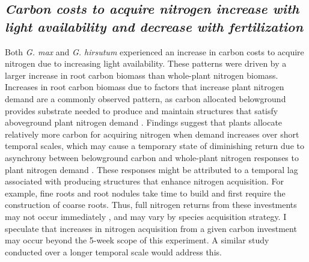 \begin{singlespace}
    \subsection{\textit{Carbon costs to acquire nitrogen increase with light availability and decrease with fertilization}}
\end{singlespace}
\noindent Both \textit{G. max} and \textit{G. hirsutum} experienced an increase in carbon costs to acquire nitrogen due to increasing light availability. These patterns were driven by a larger increase in root carbon biomass than whole-plant nitrogen biomass. Increases in root carbon biomass due to factors that increase plant nitrogen demand are a commonly observed pattern, as carbon allocated belowground provides substrate needed to produce and maintain structures that satisfy aboveground plant nitrogen demand . Findings suggest that plants allocate relatively more carbon for acquiring nitrogen when demand increases over short temporal scales, which may cause a temporary state of diminishing return due to asynchrony between belowground carbon and whole-plant nitrogen responses to plant nitrogen demand . These responses might be attributed to a temporal lag associated with producing structures that enhance nitrogen acquisition. For example, fine roots  and root nodules  take time to build and first require the construction of coarse roots. Thus, full nitrogen returns from these investments may not occur immediately , and may vary by species acquisition strategy. I speculate that increases in nitrogen acquisition from a given carbon investment may occur beyond the 5-week scope of this experiment. A similar study conducted over a longer temporal scale would address this.

